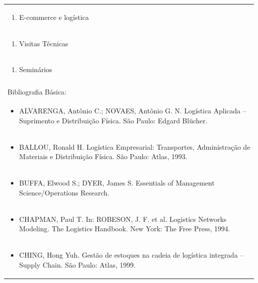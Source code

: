 \documentclass[11pt]{article}
\begin{document}
\begin{center}
\begin{longtable}{|p{4cm}|p{4cm}|p{4cm}|p{4cm}|}
\multicolumn{4}{|p{\dimexpr 16cm + 6\tabcolsep\relax}|}{\begin{enumerate}[start=17]\item E-commerce e logística\end{enumerate}}\\
\multicolumn{4}{|p{\dimexpr 16cm + 6\tabcolsep\relax}|}{\begin{enumerate}[start=18]\item Visitas Técnicas\end{enumerate}}\\
\multicolumn{4}{|p{\dimexpr 16cm + 6\tabcolsep\relax}|}{\begin{enumerate}[start=19]\item Seminários\end{enumerate}}\\
\multicolumn{4}{|p{\dimexpr 16cm + 6\tabcolsep\relax}|}{}\\
\hline
\multicolumn{4}{|p{16cm}|}{Bibliografia Básica:}\\*
\multicolumn{4}{|p{\dimexpr 16cm + 6\tabcolsep\relax}|}{\begin{itemize}\item ALVARENGA, Antônio C.; NOVAES, Antônio G. N. Logística Aplicada – Suprimento e Distribuição Física. São Paulo: Edgard Blücher.\end{itemize}}\\
\multicolumn{4}{|p{\dimexpr 16cm + 6\tabcolsep\relax}|}{\begin{itemize}\item BALLOU, Ronald H. Logística Empresarial: Transportes, Administração de Materiais e Distribuição Física. São Paulo: Atlas, 1993.\end{itemize}}\\
\multicolumn{4}{|p{\dimexpr 16cm + 6\tabcolsep\relax}|}{\begin{itemize}\item BUFFA, Elwood S.; DYER, James S. Essentials of Management Science/Operations Research.\end{itemize}}\\
\multicolumn{4}{|p{\dimexpr 16cm + 6\tabcolsep\relax}|}{\begin{itemize}\item CHAPMAN, Paul T. In: ROBESON, J. F. et al. Logistics Networks Modeling. The Logistics Handbook. New York: The Free Press, 1994.\end{itemize}}\\
\multicolumn{4}{|p{\dimexpr 16cm + 6\tabcolsep\relax}|}{\begin{itemize}\item CHING, Hong Yuh. Gestão de estoques na cadeia de logística integrada – Supply Chain. São Paulo: Atlas, 1999.\end{itemize}}\\

\end{longtable}
\end{center}
\end{document}
